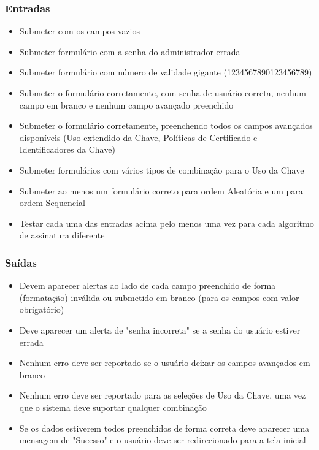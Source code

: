 \subsubsection{Entradas}
\begin{itemize}
	\item Submeter com os campos vazios 
	\item Submeter formulário com a senha do administrador errada
	\item Submeter formulário com número de validade gigante (1234567890123456789)
	\item Submeter o formulário corretamente, com senha de usuário correta, nenhum campo em branco e nenhum campo avançado preenchido
	\item Submeter o formulário corretamente, preenchendo todos os campos avançados disponíveis (Uso extendido da Chave, Políticas de Certificado e Identificadores da Chave)
	\item Submeter formulários com vários tipos de combinação para o Uso da Chave
	\item Submeter ao menos um formulário correto para ordem Aleatória e um para ordem Sequencial
	\item Testar cada uma das entradas acima pelo menos uma vez para cada algoritmo de assinatura diferente
\end{itemize}


\subsubsection{Saídas}

\begin{itemize}

	\item Devem aparecer alertas ao lado de cada campo preenchido de forma (formatação) inválida ou submetido em branco (para os campos com valor obrigatório)
	\item Deve aparecer um alerta de "senha incorreta" se a senha do usuário estiver errada
	\item Nenhum erro deve ser reportado se o usuário deixar os campos avançados em branco
	\item Nenhum erro deve ser reportado para as seleções de Uso da Chave, uma vez que o sistema deve suportar qualquer combinação
	\item Se os dados estiverem todos preenchidos de forma correta deve aparecer uma mensagem de "Sucesso" e o usuário deve ser redirecionado para a tela inicial
	
\end{itemize}

